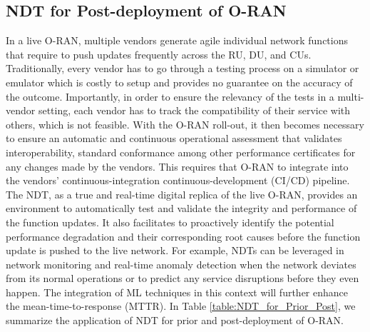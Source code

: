 \documentclass[]{IEEEtran}
\begin{document}
	\subsection{NDT for Post-deployment of O-RAN}
	
	In a live O-RAN, multiple vendors generate agile individual network functions that require to push updates frequently across the RU, DU, and CUs. Traditionally, every vendor has to go through a testing process on a simulator or emulator which is costly to setup and provides no guarantee on the accuracy of the outcome. Importantly, in order to ensure the relevancy of the tests in a multi-vendor setting, each vendor has to track the compatibility of their service with others, which is not feasible. With the O-RAN roll-out, it then becomes necessary to ensure an automatic and continuous operational assessment that validates interoperability, standard conformance among other performance certificates for any changes made by the vendors. This requires  that O-RAN to integrate into the vendors' continuous-integration continuous-development (CI/CD) pipeline.  The NDT, as a true and real-time digital replica of the live O-RAN, provides an environment to automatically test and validate the integrity and performance of the function updates. It also facilitates to proactively identify the potential performance degradation and their corresponding root causes before the function update is pushed to the live network. For example, NDTs can be leveraged in network monitoring and real-time anomaly detection when the network deviates from its normal operations or to predict any service disruptions before they even happen. The integration of ML techniques in this context will further enhance the  mean-time-to-response (MTTR). In Table \ref{table:NDT_for_Prior_Post}, we summarize the application of NDT for prior and post-deployment of O-RAN.
\end{document}
